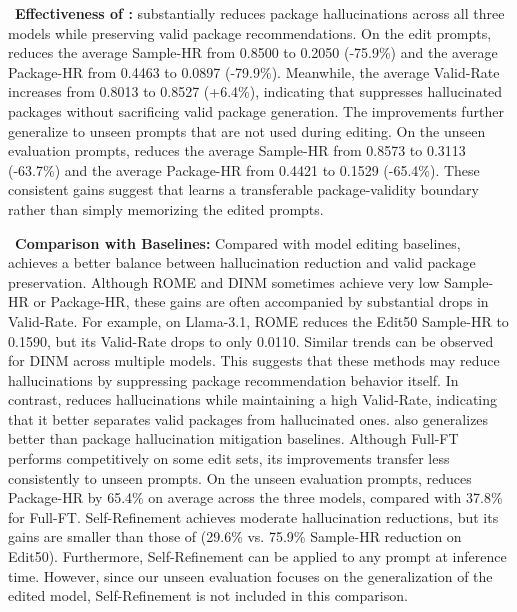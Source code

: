 \noindent\faThumbsUp~\textbf{Effectiveness of \appname:}
\appname substantially reduces package hallucinations across all three models while preserving valid package recommendations. On the edit prompts, \appname reduces the average Sample-HR from 0.8500 to 0.2050 (-75.9\%) and the average Package-HR from 0.4463 to 0.0897 (-79.9\%). Meanwhile, the average Valid-Rate increases from 0.8013 to 0.8527 (+6.4\%), indicating that \appname suppresses hallucinated packages without sacrificing valid package generation.
The improvements further generalize to unseen prompts that are not used during editing.
On the unseen evaluation prompts, \appname reduces the average Sample-HR from 0.8573 to 0.3113 (-63.7\%) and the average Package-HR from 0.4421 to 0.1529 (-65.4\%). These consistent gains suggest that \appname learns a transferable package-validity boundary rather than simply memorizing the edited prompts.


\noindent\faThumbsUp~\textbf{Comparison with Baselines:}
Compared with model editing baselines, \appname achieves a better balance between hallucination reduction and valid package preservation.
Although ROME and DINM sometimes achieve very low Sample-HR or Package-HR, these gains are often accompanied by substantial drops in Valid-Rate. For example, on Llama-3.1, ROME reduces the Edit50 Sample-HR to 0.1590, but its Valid-Rate drops to only 0.0110. Similar trends can be observed for DINM across multiple models.
This suggests that these methods may reduce hallucinations by suppressing package recommendation behavior itself. 
In contrast, \appname reduces hallucinations while maintaining a high Valid-Rate, indicating that it better separates valid packages from hallucinated ones.
\appname also generalizes better than package hallucination mitigation baselines.
Although Full-FT performs competitively on some edit sets, its improvements transfer less consistently to unseen prompts.
On the unseen evaluation prompts, \appname reduces Package-HR by 65.4\% on average across the three models, compared with 37.8\% for Full-FT.
Self-Refinement achieves moderate hallucination reductions, but its gains are smaller than those of \appname (29.6\% vs. 75.9\% Sample-HR reduction on Edit50).
Furthermore, Self-Refinement can be applied to any prompt at inference time. 
However, since our unseen evaluation focuses on the generalization of the edited model, Self-Refinement is not included in this comparison.



